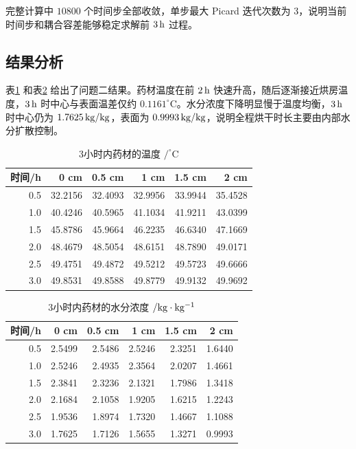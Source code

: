 \documentclass[UTF8,a4paper,12pt]{ctexart}
\numberwithin{equation}{section}
\begin{document}
完整计算中 $10800$ 个时间步全部收敛，单步最大 Picard 迭代次数为 3，说明当前时间步和耦合容差能够稳定求解前 $3\rm\,h$ 过程。

\subsection{结果分析}
表\ref{tab:q2-temp} 和表\ref{tab:q2-moist} 给出了问题二结果。药材温度在前 $2\rm\,h$ 快速升高，随后逐渐接近烘房温度，$3\rm\,h$ 时中心与表面温差仅约 $0.1161^\circ\mathrm C$。水分浓度下降明显慢于温度均衡，$3\rm\,h$ 时中心仍为 $1.7625\rm\,kg/kg$，表面为 $0.9993\rm\,kg/kg$，说明全程烘干时长主要由内部水分扩散控制。

\begin{table}[H]
  \centering
  \caption{3小时内药材的温度 $/^\circ\mathrm C$}
  \label{tab:q2-temp}
  \begin{tabular}{rrrrrr}
    \toprule
    时间/h & 0 cm & 0.5 cm & 1 cm & 1.5 cm & 2 cm\\ \midrule
    0.5 & 32.2156 & 32.4093 & 32.9956 & 33.9944 & 35.4528\\
    1.0 & 40.4246 & 40.5965 & 41.1034 & 41.9211 & 43.0399\\
    1.5 & 45.8786 & 45.9664 & 46.2235 & 46.6340 & 47.1669\\
    2.0 & 48.4679 & 48.5054 & 48.6151 & 48.7890 & 49.0171\\
    2.5 & 49.4751 & 49.4872 & 49.5212 & 49.5723 & 49.6666\\
    3.0 & 49.8531 & 49.8588 & 49.8779 & 49.9132 & 49.9692\\
    \bottomrule
  \end{tabular}
\end{table}

\begin{table}[H]
  \centering
  \caption{3小时内药材的水分浓度 $/\rm kg\cdot kg^{-1}$}
  \label{tab:q2-moist}
  \begin{tabular}{rrrrrr}
    \toprule
    时间/h & 0 cm & 0.5 cm & 1 cm & 1.5 cm & 2 cm\\ \midrule
    0.5 & 2.5499 & 2.5486 & 2.5246 & 2.3251 & 1.6440\\
    1.0 & 2.5246 & 2.4935 & 2.3564 & 2.0207 & 1.4661\\
    1.5 & 2.3841 & 2.3236 & 2.1321 & 1.7986 & 1.3418\\
    2.0 & 2.1684 & 2.1058 & 1.9205 & 1.6215 & 1.2243\\
    2.5 & 1.9536 & 1.8974 & 1.7320 & 1.4667 & 1.1088\\
    3.0 & 1.7625 & 1.7126 & 1.5655 & 1.3271 & 0.9993\\
    \bottomrule
  \end{tabular}
\end{table}
\end{document}
